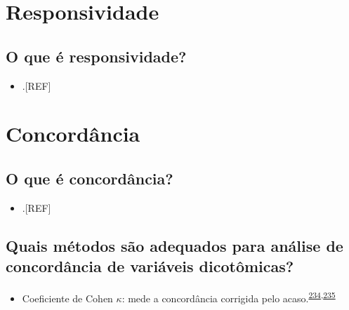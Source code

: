 \documentclass[
  a4paper,
]{book}
\providecommand{\tightlist}{%
  \setlength{\itemsep}{0pt}\setlength{\parskip}{0pt}}
\begin{document}
\hypertarget{responsividade}{%
\section{Responsividade}\label{responsividade}}

\hypertarget{o-que-uxe9-responsividade}{%
\subsection{O que é responsividade?}\label{o-que-uxe9-responsividade}}

\begin{itemize}
\tightlist
\item
  .{[}REF{]}
\end{itemize}

\hypertarget{concordancia}{%
\section{Concordância}\label{concordancia}}

\hypertarget{o-que-uxe9-concorduxe2ncia}{%
\subsection{O que é concordância?}\label{o-que-uxe9-concorduxe2ncia}}

\begin{itemize}
\tightlist
\item
  .{[}REF{]}
\end{itemize}

\hypertarget{quais-muxe9todos-suxe3o-adequados-para-anuxe1lise-de-concorduxe2ncia-de-variuxe1veis-dicotuxf4micas}{%
\subsection{Quais métodos são adequados para análise de concordância de variáveis dicotômicas?}\label{quais-muxe9todos-suxe3o-adequados-para-anuxe1lise-de-concorduxe2ncia-de-variuxe1veis-dicotuxf4micas}}

\begin{itemize}
\tightlist
\item
  Coeficiente de Cohen \(\kappa\): mede a concordância corrigida pelo acaso.\textsuperscript{\protect\hyperlink{ref-scott1955}{234},\protect\hyperlink{ref-cohen1960}{235}}
\end{itemize}
\end{document}
